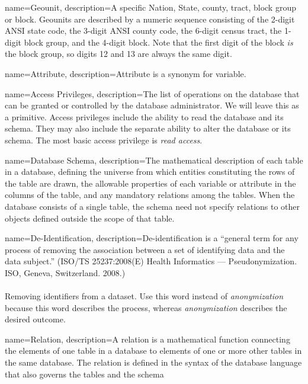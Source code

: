 {
    name=Geounit,
    description={A specific Nation, State, county, tract, block group or block. Geounits are described by a numeric sequence consisting of the 2-digit ANSI state code, the 3-digit ANSI county code, the 6-digit census tract, the 1-digit block group, and the 4-digit block. Note that the first digit of the block \emph{is} the block group, so digits 12 and 13 are always the same digit.}
}

{
    name=Attribute,
    description={Attribute is a synonym for variable.}
}

{
    name=Access Privileges,
    description={The list of operations on the database that can be granted or controlled by the database administrator. We will leave this as a primitive. Access privileges include the ability to read the database and its schema. They may also include the separate ability to alter the database or its schema. The most basic access privilege is \textit{read access}.}
}

{
    name=Database Schema,
    description={The mathematical description of each table in a database, defining the universe from which entities constituting the rows of the table are drawn, the allowable properties of each variable or attribute in the columns of the table, and any mandatory relations among the tables. When the database consists of a single table, the schema need not specify relations to other objects defined outside the scope of that table.}
}

{
    name=De-Identification,
    description={De-identification is a ``general term for any process
    of removing the association between a set of identifying data and
    the data subject.'' (ISO/TS 25237:2008(E) Health Informatics — Pseudonymization. ISO, Geneva, Switzerland. 2008.)\\
    \\
    Removing identifiers from a dataset. Use this word instead of \textit{\gls{anonymization}} because this word describes the process, whereas \textit{anonymization} describes the desired outcome.}
}

{
    name=Relation,
    description={A relation is a mathematical function connecting the elements of one table in a database to elements of one or more other tables in the same database. The relation is defined in the syntax of the database language that also governs the tables and the schema}
}

